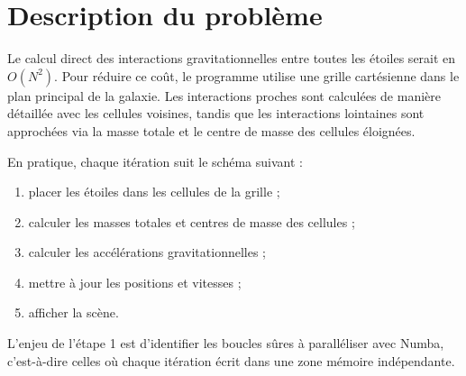 \section{Description du problème}

Le calcul direct des interactions gravitationnelles entre toutes les étoiles serait en \(O(N^2)\). Pour réduire ce coût, le programme utilise une grille cartésienne dans le plan principal de la galaxie. Les interactions proches sont calculées de manière détaillée avec les cellules voisines, tandis que les interactions lointaines sont approchées via la masse totale et le centre de masse des cellules éloignées.

En pratique, chaque itération suit le schéma suivant :
\begin{enumerate}[label=\arabic*.]
    \item placer les étoiles dans les cellules de la grille ;
    \item calculer les masses totales et centres de masse des cellules ;
    \item calculer les accélérations gravitationnelles ;
    \item mettre à jour les positions et vitesses ;
    \item afficher la scène.
\end{enumerate}

L'enjeu de l'étape 1 est d'identifier les boucles sûres à paralléliser avec Numba, c'est-à-dire celles où chaque itération écrit dans une zone mémoire indépendante.
